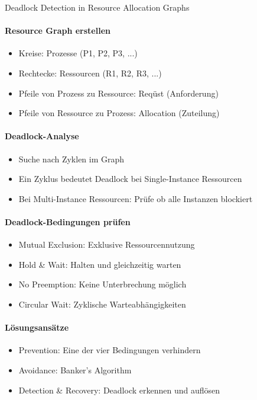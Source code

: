 \raggedcolumns

\begin{KR}{Deadlock Detection in Resource Allocation Graphs}
    \paragraph{Resource Graph erstellen}
    \begin{itemize}
        \item Kreise: Prozesse (P1, P2, P3, ...)
        \item Rechtecke: Ressourcen (R1, R2, R3, ...)
        \item Pfeile von Prozess zu Ressource: Reqüst (Anforderung)
        \item Pfeile von Ressource zu Prozess: Allocation (Zuteilung)
    \end{itemize}
    
    \paragraph{Deadlock-Analyse}
    \begin{itemize}
        \item Suche nach Zyklen im Graph
        \item Ein Zyklus bedeutet Deadlock bei Single-Instance Ressourcen
        \item Bei Multi-Instance Ressourcen: Prüfe ob alle Instanzen blockiert
    \end{itemize}
    
    \paragraph{Deadlock-Bedingungen prüfen}
    \begin{itemize}
        \item Mutual Exclusion: Exklusive Ressourcennutzung
        \item Hold \& Wait: Halten und gleichzeitig warten
        \item No Preemption: Keine Unterbrechung möglich
        \item Circular Wait: Zyklische Warteabhängigkeiten
    \end{itemize}
    
    \paragraph{Lösungsansätze}
    \begin{itemize}
        \item Prevention: Eine der vier Bedingungen verhindern
        \item Avoidance: Banker's Algorithm
        \item Detection \& Recovery: Deadlock erkennen und auflösen
    \end{itemize}
\end{KR}


